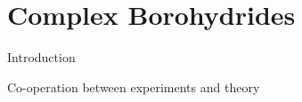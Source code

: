 \chapter{Complex Borohydrides}
\label{chap:borohydrides}

\bit
\item Introduction
\item Co-operation between experiments and theory
\item {}
\item {}
\eit

\placeholder
